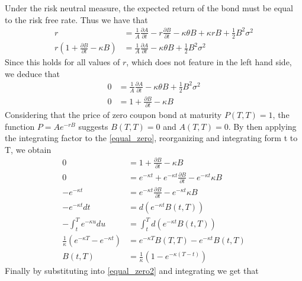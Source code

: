  Under the risk neutral measure, the expected return of the bond must be equal to the risk free rate. Thus we have that
 \begin{align*}
     r  &= \frac{1}{A} \frac{\partial A}{\partial t} - r \frac{\partial B}{\partial t} - \kappa \theta B 
     + \kappa r B + \frac{1}{2} B^2 \sigma^2  \\
     r \left( 1 + \frac{\partial B}{\partial t} - \kappa B \right) & =\frac{1}{A} \frac{\partial A}{\partial t} 
     - \kappa \theta B + \frac{1}{2} B^2 \sigma^2 
 \end{align*}
 Since this holds for all values of $r$, which does not feature in the left hand side, we deduce that
 \begin{align}
     0 &= \frac{1}{A} \frac{\partial A}{\partial t} - \kappa \theta B + \frac{1}{2} B^2 \sigma^2 \label{equal_zero2}\\
     0 &=1 + \frac{\partial B}{\partial t} - \kappa B \label{equal_zero}
 \end{align}
 Considering that the price of zero coupon bond at maturity $P(T,T)=1$, the function $P=A e^{-rB}$ suggests $B(T,T)=0$
 and $A(T,T)=0$. By then applying the integrating factor to the \autoref{equal_zero}, reorganizing and integrating
 form t to T, we obtain
 \begin{align}
    0 &= 1 + \frac{\partial B}{\partial t} - \kappa B \nonumber  \\
    0 &= e^{-\kappa t} + e^{-\kappa t} \frac{\partial B}{\partial t} - e^{-\kappa t} \kappa B \nonumber \\
    -e^{-\kappa t} &= e^{-\kappa t} \frac{\partial B}{\partial t} - e^{-\kappa t} \kappa B  \nonumber \\
    -e^{-\kappa t} dt &= d \left( e^{-\kappa t} B(t, T) \right) \nonumber \\
    - \int_{t}^{T} e^{-\kappa u} du &= \int_{t}^{T} d \left( e^{-\kappa t} B(t, T) \right) \nonumber  \\
    \frac{1}{\kappa} \left( e^{-\kappa T} - e^{-\kappa t} \right) &= e^{-\kappa T} B(T, T) - e^{-\kappa t} B(t, T)\nonumber  \\
    B(t,T) & =\frac{1}{\kappa} \left( 1 - e^{-\kappa (T-t)} \right)  
 \end{align}
 Finally  by substituting into \autoref{equal_zero2} and integrating we get that
